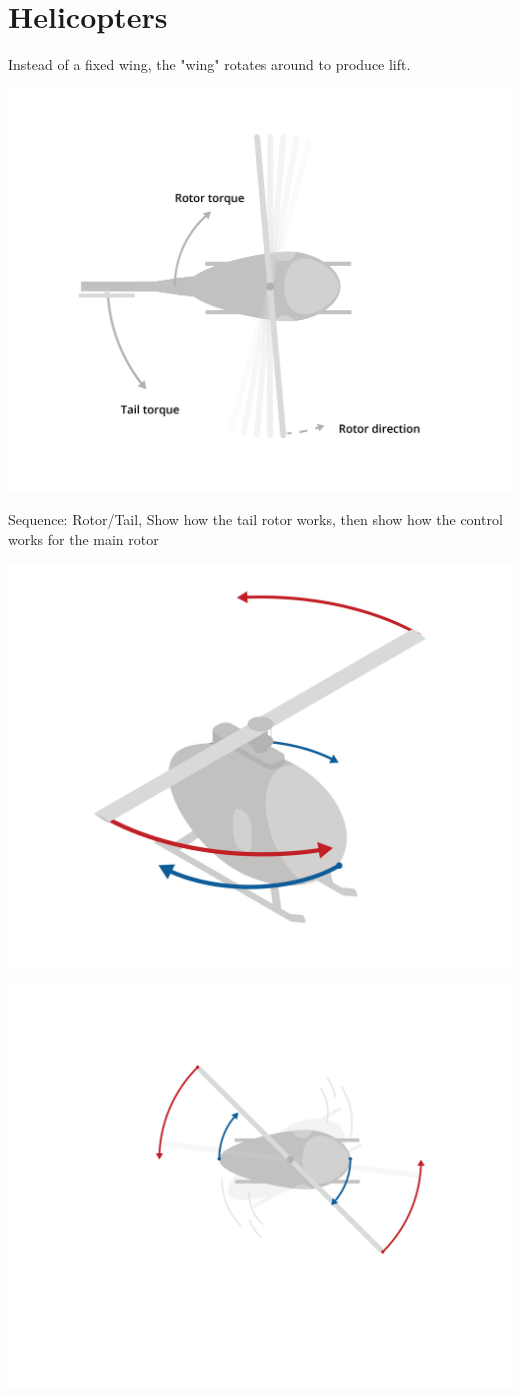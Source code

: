 \chapter{Helicopters}


Instead of a fixed wing, the "wing" rotates around to produce lift.

\includegraphics[width=.75\textwidth]{torque.png}


Sequence: Rotor/Tail, Show how the tail rotor works, then show how the control works for the main rotor

\includegraphics[width=.75\textwidth]{tailless2.png}

\includegraphics[width=.75\textwidth]{tailless1.png}


